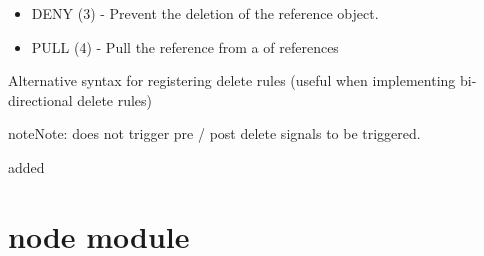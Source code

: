 \documentclass[letterpaper,10pt,english]{sphinxmanual}
\begin{document}
\begin{fulllineitems}
\begin{fulllineitems}
\begin{itemize}
\item {} 
DENY       (3)  - Prevent the deletion of the reference object.

\item {} 
PULL       (4)  - Pull the reference from a  of references

\end{itemize}

Alternative syntax for registering delete rules (useful when implementing
bi-directional delete rules)

\begin{sphinxVerbatim}[commandchars=\\\{\}]
 
      
      

  
\end{sphinxVerbatim}

\begin{sphinxadmonition}{note}{Note:}
 does not trigger pre / post delete signals to be
triggered.
\end{sphinxadmonition}

added 

\end{fulllineitems}


\end{fulllineitems}



\chapter{node module}
\label{\detokenize{node:module-node}}\label{\detokenize{node:node-module}}\label{\detokenize{node::doc}}
\end{document}

